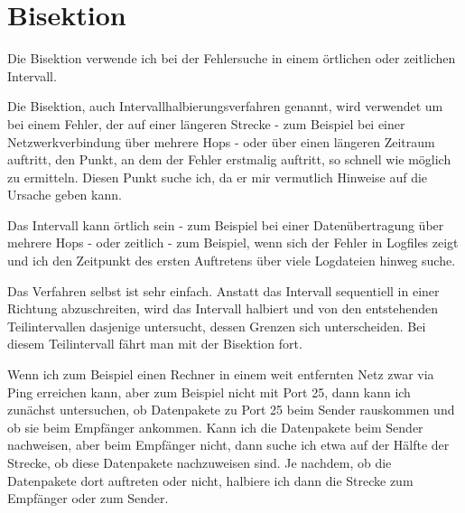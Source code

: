 \section{Bisektion}
\label{sec:bisektion}

\begin{abstractsec}
  Die Bisektion verwende ich bei der Fehlersuche in einem örtlichen oder
  zeitlichen Intervall.
\end{abstractsec}

\begin{normaltext}
  Die Bisektion, auch Intervallhalbierungsverfahren genannt, wird verwendet um
  bei einem Fehler, der auf einer längeren Strecke - zum Beispiel bei einer
  Netzwerkverbindung über mehrere Hops - oder über einen längeren Zeitraum
  auftritt, den Punkt, an dem der Fehler erstmalig auftritt, so schnell wie
  möglich zu ermitteln. Diesen Punkt suche ich, da er mir vermutlich Hinweise
  auf die Ursache geben kann.

  Das Intervall kann örtlich sein - zum Beispiel bei einer Datenübertragung
  über mehrere Hops - oder zeitlich - zum Beispiel, wenn sich der Fehler in
  Logfiles zeigt und ich den Zeitpunkt des ersten Auftretens über viele
  Logdateien hinweg suche.

  Das Verfahren selbst ist sehr einfach. Anstatt das Intervall sequentiell in
  einer Richtung abzuschreiten, wird das Intervall halbiert und von den
  entstehenden Teilintervallen dasjenige untersucht, dessen Grenzen sich
  unterscheiden. Bei diesem Teilintervall fährt man mit der Bisektion fort.

  Wenn ich zum Beispiel einen Rechner in einem weit entfernten Netz zwar via
  Ping erreichen kann, aber zum Beispiel nicht mit Port 25, dann kann ich 
  zunächst untersuchen, ob Datenpakete zu Port 25 beim Sender rauskommen und
  ob sie beim Empfänger ankommen. Kann ich die Datenpakete beim Sender
  nachweisen, aber beim Empfänger nicht, dann suche ich etwa auf der Hälfte
  der Strecke, ob diese Datenpakete nachzuweisen sind. Je nachdem, ob die
  Datenpakete dort auftreten oder nicht, halbiere ich dann die Strecke zum
  Empfänger oder zum Sender. 
\end{normaltext}



